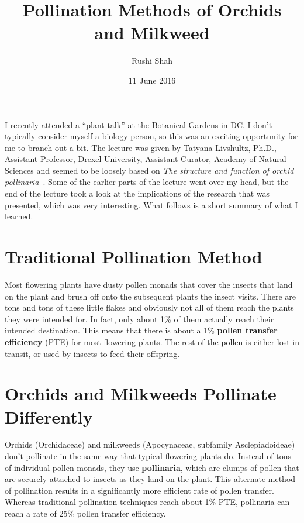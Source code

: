 \documentclass[12pt]{article}
\author{Rushi Shah}
\date{11 June 2016}
\title{Pollination Methods of Orchids and Milkweed}
\begin{document}
\maketitle

I recently attended a ``plant-talk'' at the Botanical Gardens in DC. I don't typically consider myself a biology person, so this was an exciting opportunity for me to branch out a bit. \href{https://www.usbg.gov/events/2016/05/18/lecture-milkweeds-and-orchids-survival-most-efficient}{The lecture} was given by Tatyana Livshultz, Ph.D., Assistant Professor, Drexel University, Assistant Curator, Academy of Natural Sciences and seemed to be loosely based on \textit{The structure and function of orchid pollinaria}~\cite{Johnson2000}. Some of the earlier parts of the lecture went over my head, but the end of the lecture took a look at the implications of the research that was presented, which was very interesting. What follows is a short summary of what I learned. 

\section{Traditional Pollination Method}

  Most flowering plants have dusty pollen monads that cover the insects that land on the plant and brush off onto the subsequent plants the insect visits. There are tons and tons of these little flakes and obviously not all of them reach the plants they were intended for. In fact, only about 1\% of them actually reach their intended destination. This means that there is about a 1\% \textbf{pollen transfer efficiency}  (PTE) for most flowering plants. The rest of the pollen is either lost in transit, or used by insects to feed their offspring. 


\section{Orchids and Milkweeds Pollinate Differently}

  Orchids (Orchidaceae) and milkweeds (Apocynaceae, subfamily Asclepiadoideae) don't pollinate in the same way that typical flowering plants do. Instead of tons of individual pollen monads, they use \textbf{pollinaria}, which are clumps of pollen that are securely attached to insects as they land on the plant. This alternate method of pollination results in a significantly more efficient rate of pollen transfer. Whereas traditional pollination techniques reach about 1\% PTE, pollinaria can reach a rate of 25\% pollen transfer efficiency. 
\end{document}
